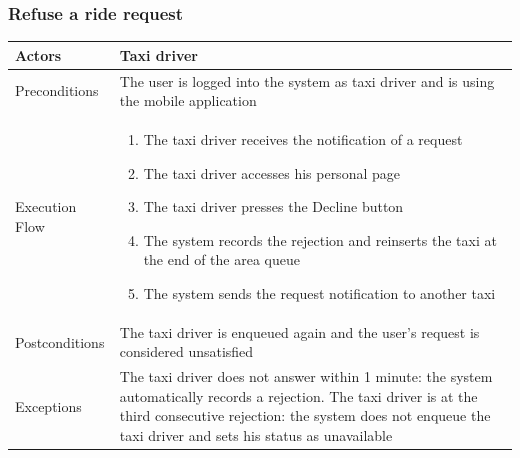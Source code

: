 		\subsubsection{Refuse a ride request}
			\begin{center}
				\begin{tabular}{ | l | p{8cm} |}
					\hline Actors & Taxi driver
					\\ \hline
					Preconditions &
					The user is logged into the system as taxi driver and is using the mobile application
					\\ \hline
					Execution Flow &
					\begin{enumerate}
						\item The taxi driver receives the notification of a request
						\item The taxi driver accesses his personal page
						\item The taxi driver presses the Decline button
						\item The system records the rejection and reinserts the taxi at the end of
						the area queue
						\item The system sends the request notification to another taxi
					\end{enumerate}
					\\ \hline
					Postconditions & The taxi driver is enqueued again and the user's request
					is considered unsatisfied
					\\ \hline
					Exceptions &
					The taxi driver does not answer within 1 minute:
					the system automatically records a rejection.
					The taxi driver is at the third consecutive rejection:
					the system does not enqueue the taxi driver and sets his status as unavailable
					\\ \hline
				\end{tabular}
			\end{center}